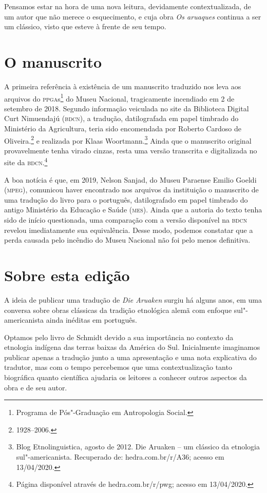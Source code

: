 Pensamos estar na hora de uma nova leitura, devidamente contextualizada, de um autor que não merece o esquecimento, e cuja obra \textit{Os aruaques} continua a ser um clássico, visto que esteve à frente de seu tempo.

\section{O manuscrito}

A primeira referência à existência de um manuscrito traduzido nos leva aos arquivos do \textsc{ppga}s\footnote{Programa de Pós"-Graduação em Antropologia Social.} do Museu Nacional, 
tragicamente incendiado em 2 de setembro de 2018. Segundo informação veiculada no site da Biblioteca Digital Curt Nimuendajú (\textsc{bdcn}), a tradução, datilografada em papel timbrado do Ministério da Agricultura, teria sido encomendada por Roberto Cardoso de Oliveira.\footnote{1928--2006.} e realizada por Klaas Woortmann.\footnote{Blog Etnolinguistica, agosto de 2012. Die Aruaken -- um clássico da etnologia sul"-americanista. Recuperado de: hedra.com.br/r/A36; acesso em 13/04/2020.} Ainda que o manuscrito original provavelmente tenha virado cinzas, resta uma versão transcrita e digitalizada no site da \textsc{bdcn}.\footnote{Página disponível através de hedra.com.br/r/pwg; acesso em 13/04/2020.} 

A boa notícia é que, em 2019, Nelson Sanjad, do Museu Paraense Emilio Goeldi (\textsc{mpeg}), comunicou haver encontrado nos arquivos da instituição o manuscrito de uma tradução do livro para o português, datilografado em papel timbrado do antigo Ministério da Educação e Saúde (\textsc{mes}). Ainda que a autoria do texto tenha sido de início questionada, uma comparação com a versão disponível na \textsc{bdcn} revelou imediatamente sua equivalência. Desse modo, podemos constatar que a perda causada pelo incêndio do Museu Nacional não foi pelo menos definitiva.

\section{Sobre esta edição}

A ideia de publicar uma tradução de \textit{Die Aruaken} surgiu há alguns anos, em uma conversa sobre obras clássicas da tradição etnológica alemã com enfoque sul"-americanista ainda inéditas em português. 

Optamos pelo livro de Schmidt devido a sua importância no contexto da etnologia indígena das terras baixas da América do Sul. Inicialmente imaginamos publicar apenas a tradução junto a uma apresentação e uma nota explicativa do tradutor, mas com o tempo percebemos que uma contextualização tanto biográfica quanto científica ajudaria os leitores a conhecer outros aspectos da obra e de seu autor.

